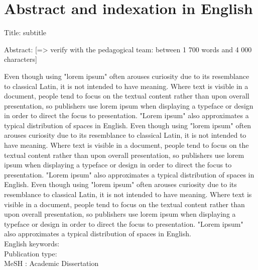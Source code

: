 \chapter*{Abstract and indexation in English}\label{chap:abstract}

Title: subtitle

Abstract: [=> verify with the pedagogical team: between 1 700 words and 4 000 characters]

Even though using "lorem ipsum" often arouses curiosity due to its resemblance to classical Latin, it is not intended to have meaning. Where text is visible in a document, people tend to focus on the textual content rather than upon overall presentation, so publishers use lorem ipsum when displaying a typeface or design in order to direct the focus to presentation. "Lorem ipsum" also approximates a typical distribution of spaces in English. Even though using "lorem ipsum" often arouses curiosity due to its resemblance to classical Latin, it is not intended to have meaning. Where text is visible in a document, people tend to focus on the textual content rather than upon overall presentation, so publishers use lorem ipsum when displaying a typeface or design in order to direct the focus to presentation. "Lorem ipsum" also approximates a typical distribution of spaces in English. Even though using "lorem ipsum" often arouses curiosity due to its resemblance to classical Latin, it is not intended to have meaning. Where text is visible in a document, people tend to focus on the textual content rather than upon overall presentation, so publishers use lorem ipsum when displaying a typeface or design in order to direct the focus to presentation. "Lorem ipsum" also approximates a typical distribution of spaces in English. 
\\


English keywords:	
\\


Publication type:
\\

MeSH : Academic Dissertation 




